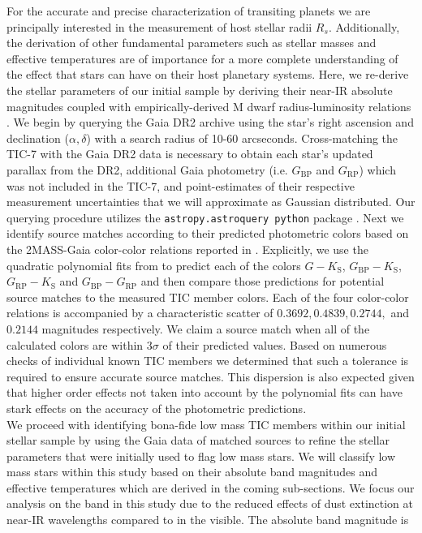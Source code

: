 For the accurate and precise characterization of transiting planets we are principally
interested in the measurement of host stellar radii $R_s$. Additionally, the derivation of other fundamental
parameters such as stellar masses and effective temperatures are of importance for a more complete understanding
of the effect that stars can have on their host planetary systems. Here, we re-derive
the stellar parameters of our initial sample by deriving their near-IR absolute magnitudes coupled with
empirically-derived M dwarf radius-luminosity relations \citep{mann15}. We begin by querying the Gaia DR2
archive using the star's right ascension and declination ($\alpha,\delta$) with a search radius of 10-60 arcseconds.
Cross-matching the TIC-7 with the Gaia DR2 data is necessary to obtain each star's updated parallax from the DR2,
additional Gaia photometry (i.e. $G_{\text{BP}}$ and $G_{\text{RP}}$) which was not included in the TIC-7,
and point-estimates of their respective measurement uncertainties that we will approximate as Gaussian distributed.
Our querying procedure utilizes the \texttt{astropy.astroquery python} package \citep{ginsburg17}.
Next we identify source matches according to their predicted photometric colors based on the 2MASS-Gaia
color-color relations reported in \cite{evans18}. Explicitly, we use the quadratic polynomial fits from
\cite{evans18} to predict each of the colors
$G-K_{\text{S}}$, $G_{\text{BP}}-K_{\text{S}}$, $G_{\text{RP}}-K_{\text{S}}$ and $G_{\text{BP}}-G_{\text{RP}}$ and then compare
those predictions for potential source matches to the measured TIC member colors. Each of the four color-color
relations is accompanied by a characteristic scatter of $0.3692, 0.4839, 0.2744,$ and $0.2144$ magnitudes
respectively. We claim a source match when all of the calculated colors are within $3\sigma$ of their predicted
values. Based on numerous checks of individual known TIC members we determined
that such a tolerance is required to ensure accurate source matches. This dispersion is also expected given
that higher order effects not taken into account by the polynomial fits can have stark effects on the accuracy
of the photometric predictions. \\

We proceed with identifying bona-fide low mass TIC members within our initial stellar sample by using the Gaia
data of matched sources to refine the stellar parameters that were initially used to flag low mass stars. 
We will classify low mass stars within this study based on their absolute \Ks{-}band magnitudes
\citep{delfosse00,mann15,benedict16} and effective temperatures which are derived in the coming sub-sections.
We focus our analysis on the \Ks{-}band in this study due to the reduced effects of dust
extinction at near-IR wavelengths compared to in the visible. The absolute \Ks{-}band magnitude is

